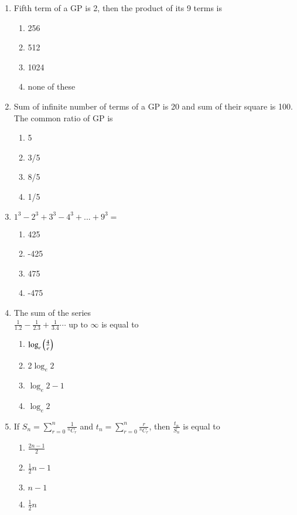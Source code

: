 \documentclass[journal,12pt,twocolumn]{IEEEtran}
\theoremstyle{remark}
\begin{document}
\begin{enumerate}[label={\arabic*.}]
\item {Fifth term of a GP is 2, then the product of its 9 terms is}
{\hfill{}}
\begin{enumerate}[label={\brak{\alph*}}]
\item  {256}
\item  {512}
\item  {1024}
\item  {none of these}
\end{enumerate}

\item {Sum of infinite number of terms of a GP is 20 and sum of their square is 100. The common ratio of GP is}
{\hfill{}} 
\begin{enumerate}[label={\brak{\alph*}}]
\item  {5}
\item  {3/5}
\item  {8/5}
\item  {1/5}
\end{enumerate} 

\item {$1^{3}-2^{3}+3^{3}-4^{3}+...
+9^{3}=$}
{\hfill{}} 
\begin{enumerate}[label={\brak{\alph*}}]
\item  {425}
\item  {-425}
\item  {475}
\item  {-475}
\end{enumerate}

\item {The sum of the series \\ $\frac{1}{1.2}-\frac{1}{2.3}+\frac{1}{3.4}\cdots \text{ up to } \infty$ is equal to} 
{\hfill{}} 
\begin{enumerate}[label={\brak{\alph*}}]
\item  {$\log_e \left(\frac{4}{e}\right)$}
\item  {2$\log_e 2$}
\item  {$\log_e 2-1$}
\item  {$\log_e 2$}
\end{enumerate}

\item {If $S_n = \sum\limits_{r=0}^{n} \frac{1}{{}^{n}C_{r}}$ and $t_n = \sum\limits_{r=0}^{n} \frac{r}{{}^{n}C_{r}}$, then $\frac{t_n}{S_n}$ is equal to}
{\hfill{}} 
\begin{enumerate}[label={\brak{\alph*}}]
\item  {$\frac{2n-1}{2}$}
\item  {$\frac{1}{2}n-1$}
\item  {$n-1$}
\item  {$\frac{1}{2}n$}
\end{enumerate}


\end{enumerate}
\end{document}
